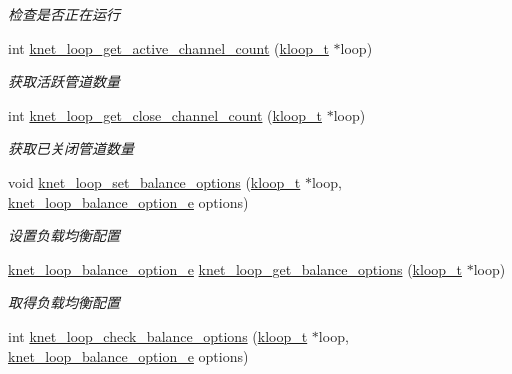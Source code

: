 \begin{DoxyCompactItemize}
\begin{DoxyCompactList}\small\item\em 检查是否正在运行 \end{DoxyCompactList}\item 
int \hyperlink{a00117_ga1eca6d310350a4545182666db28fb91f_ga1eca6d310350a4545182666db28fb91f}{knet\+\_\+loop\+\_\+get\+\_\+active\+\_\+channel\+\_\+count} (\hyperlink{a00056_a97fc76209a58362019f1ded9169e397f_a97fc76209a58362019f1ded9169e397f}{kloop\+\_\+t} $\ast$loop)
\begin{DoxyCompactList}\small\item\em 获取活跃管道数量 \end{DoxyCompactList}\item 
int \hyperlink{a00117_ga8a8c7aee4eed09d50062a5f464cdba7a_ga8a8c7aee4eed09d50062a5f464cdba7a}{knet\+\_\+loop\+\_\+get\+\_\+close\+\_\+channel\+\_\+count} (\hyperlink{a00056_a97fc76209a58362019f1ded9169e397f_a97fc76209a58362019f1ded9169e397f}{kloop\+\_\+t} $\ast$loop)
\begin{DoxyCompactList}\small\item\em 获取已关闭管道数量 \end{DoxyCompactList}\item 
void \hyperlink{a00076_a1f1c1aa48792e069f46d4586da064e30_a1f1c1aa48792e069f46d4586da064e30}{knet\+\_\+loop\+\_\+set\+\_\+balance\+\_\+options} (\hyperlink{a00056_a97fc76209a58362019f1ded9169e397f_a97fc76209a58362019f1ded9169e397f}{kloop\+\_\+t} $\ast$loop, \hyperlink{a00056_aa131da8fb72468b39b6ee0e2d46b17b2_aa131da8fb72468b39b6ee0e2d46b17b2}{knet\+\_\+loop\+\_\+balance\+\_\+option\+\_\+e} options)
\begin{DoxyCompactList}\small\item\em 设置负载均衡配置 \end{DoxyCompactList}\item 
\hyperlink{a00056_aa131da8fb72468b39b6ee0e2d46b17b2_aa131da8fb72468b39b6ee0e2d46b17b2}{knet\+\_\+loop\+\_\+balance\+\_\+option\+\_\+e} \hyperlink{a00076_a127c7897dd1ea9db069c7855bbebb557_a127c7897dd1ea9db069c7855bbebb557}{knet\+\_\+loop\+\_\+get\+\_\+balance\+\_\+options} (\hyperlink{a00056_a97fc76209a58362019f1ded9169e397f_a97fc76209a58362019f1ded9169e397f}{kloop\+\_\+t} $\ast$loop)
\begin{DoxyCompactList}\small\item\em 取得负载均衡配置 \end{DoxyCompactList}\item 
int \hyperlink{a00076_a6bb7816f43410b76b5b0c6d0f6edfbd8_a6bb7816f43410b76b5b0c6d0f6edfbd8}{knet\+\_\+loop\+\_\+check\+\_\+balance\+\_\+options} (\hyperlink{a00056_a97fc76209a58362019f1ded9169e397f_a97fc76209a58362019f1ded9169e397f}{kloop\+\_\+t} $\ast$loop, \hyperlink{a00056_aa131da8fb72468b39b6ee0e2d46b17b2_aa131da8fb72468b39b6ee0e2d46b17b2}{knet\+\_\+loop\+\_\+balance\+\_\+option\+\_\+e} options)

\end{DoxyCompactItemize}
